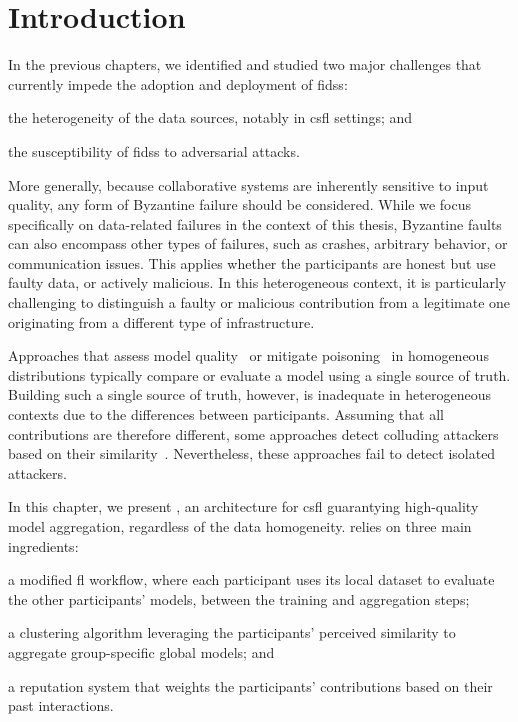 \section{Introduction\label{sec:radar.intro}}

In the previous chapters, we identified and studied two major challenges that currently impede the adoption and deployment of \glspl{fids}: \begin{enumerate*}[(1)]
  \item the heterogeneity of the data sources, notably in \gls{csfl} settings; and
  \item the susceptibility of \glspl{fids} to adversarial attacks.
\end{enumerate*}
More generally, because collaborative systems are inherently sensitive to input quality, any form of Byzantine failure should be considered.
While we focus specifically on data-related failures in the context of this thesis, Byzantine faults can also encompass other types of failures, such as crashes, arbitrary behavior, or communication issues.
This applies whether the participants are honest but use faulty data, or actively malicious.
In this heterogeneous context, it is particularly challenging to distinguish a faulty or malicious contribution from a legitimate one originating from a different type of infrastructure.

Approaches that assess model quality~\cite{pejo_QualityInferenceFederated_2023} or mitigate poisoning~\cite{blanchard_Machinelearningadversaries_2017,cao_FLTrustByzantinerobustFederated_2022} in homogeneous distributions typically compare or evaluate a model using a single source of truth.
Building such a single source of truth, however, is inadequate in heterogeneous contexts due to the differences between participants. 
Assuming that all contributions are therefore different, some approaches detect colluding attackers based on their similarity~\cite{fung_LimitationsFederatedLearning_2020,awan_CONTRADefendingPoisoning_2021}. 
Nevertheless, these approaches fail to detect isolated attackers.

In this chapter, we present \thecontrib, an architecture for \gls{csfl} guarantying high-quality model aggregation, regardless of the data homogeneity.
\thecontrib relies on three main ingredients:
\begin{enumerate*}[label=\em {\roman*})]
    \item a modified \gls{fl} workflow, where each participant uses its local dataset to evaluate the other participants' models, between the training and aggregation steps;
    \item a clustering algorithm leveraging the participants' perceived similarity to aggregate group-specific global models; and
    \item a reputation system that weights the participants' contributions based on their past interactions.
\end{enumerate*}

